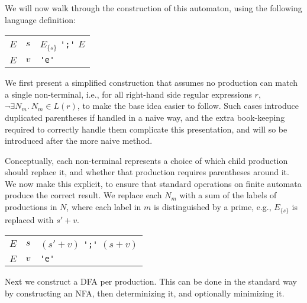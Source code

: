 \documentclass[acmsmall,review,anonymous]{acmart}\settopmatter{printfolios=true,printccs=false,printacmref=false}
\begin{document}
We will now walk through the construction of this automaton, using the following language definition:

\begin{center}
\begin{tabular}{@{}l@{\quad$->$\quad}l@{ $:$\quad}l@{}}
  \toprule
  $E$ & $s$ & $E_{\{s\}}$ \verb|';'| $E$ \\
  $E$ & $v$ & \verb|'e'| \\
  \bottomrule
\end{tabular}
\end{center}

\noindent We first present a simplified construction that assumes no production can match a single non-terminal, i.e., for all right-hand side regular expressions $r$, $\neg \exists N_m.\ N_m \in L(r)$, to make the base idea easier to follow. Such cases introduce duplicated parentheses if handled in a naive way, and the extra book-keeping required to correctly handle them complicate this presentation, and will so be introduced after the more naive method.

Conceptually, each non-terminal represents a choice of which child production should replace it, and whether that production requires parentheses around it. We now make this explicit, to ensure that standard operations on finite automata produce the correct result. We replace each $N_m$ with a sum of the labels of productions in $N$, where each label in $m$ is distinguished by a prime, e.g., $E_{\{s\}}$ is replaced with $s' + v$.

\begin{center}
\begin{tabular}{@{}l@{\quad$->$\quad}l@{ $:$\quad}l@{}}
  \toprule
  $E$ & $s$ & $(s' + v)$ \verb|';'| $(s + v)$ \\
  $E$ & $v$ & \verb|'e'| \\
  \bottomrule
\end{tabular}
\end{center}

\noindent Next we construct a DFA per production. This can be done in the standard way by constructing an NFA, then determinizing it, and optionally minimizing it.

\begin{center}
\end{center}
\end{document}
